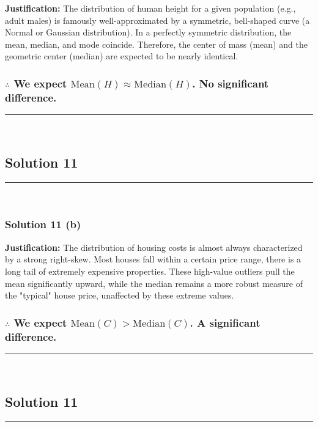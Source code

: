 \documentclass{article}
\begin{document}
\parbox{\textwidth}{
    \textbf{Justification:} The distribution of human height for a given population (e.g., adult males) is famously well-approximated by a symmetric, bell-shaped curve (a Normal or Gaussian distribution). In a perfectly symmetric distribution, the mean, median, and mode coincide. Therefore, the center of mass (mean) and the geometric center (median) are expected to be nearly identical.
}

\subsubsection*{\normalfont $\therefore$ We expect $\text{Mean}(H) \approx \text{Median}(H)$. No significant difference.}

\noindent\rule{\textwidth}{0.4pt}\\

\newpage
\subsection*{Solution 11}
\noindent\rule{\textwidth}{0.4pt}\\
\subsubsection*{Solution  11 (b)}

\parbox{\textwidth}{
    \textbf{Justification:} The distribution of housing costs is almost always characterized by a strong right-skew. Most houses fall within a certain price range, there is a long tail of extremely expensive properties. These high-value outliers pull the mean significantly upward, while the median remains a more robust measure of the "typical" house price, unaffected by these extreme values.
}

\subsubsection*{\normalfont $\therefore$ We expect $\text{Mean}(C) > \text{Median}(C)$. A significant difference.}

\noindent\rule{\textwidth}{0.4pt}\\

\newpage

\subsection*{Solution 11}
\noindent\rule{\textwidth}{0.4pt}\\
\end{document}

